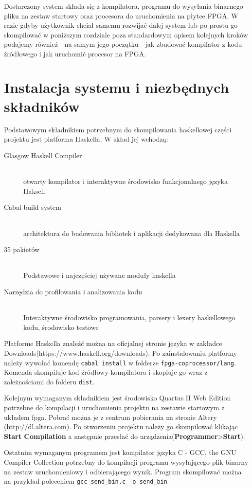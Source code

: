 Dostarczony system składa się z kompilatora, programu do wysyłania binarnego pliku na zestaw startowy oraz procesora do uruchomienia na płytce FPGA. W razie gdyby użytkownik chciał samemu rozwijać dalej system lub po prostu go skompilować w poniższym rozdziale poza standardowym opisem kolejnych kroków podajemy również - na samym jego początku - jak zbudować kompilator z kodu źródłowego i jak uruchomić procesor na FPGA.
\section{Instalacja systemu i niezbędnych składników}
Podstawowym składnikiem potrzebnym do skompilowania haskellowej części projektu jest platforma Haskella. W skład jej wchodzą:
\begin{description}
  \item[Glasgow Haskell Compiler] \hfill \\
  otwarty kompilator i interaktywne środowisko funkcjonalnego języka Haksell 
  \item[Cabal build system] \hfill \\
  architektura do budowania bibliotek i aplikacji dedykowana dla Haskella
  \item[35 pakietów] \hfill \\
  Podstawowe i najczęściej używane moduły haskella
  \item[Narzędzia do profilowania i analizowania kodu] \hfill \\
  Interaktywne środowisko programowania, parsery i lexery haskellowego kodu, środowisko testowe
\end{description}

Platforme Haskella znaleźć można na oficjalnej stronie języka w zakładce Downloads(https://www.haskell.org/downloads).
Po zainstalowaniu platformy należy wywołać komendę \texttt{cabal install} w folderze \texttt{fpga-coprocessor/lang}. Komenda skompiluje kod źródłowy kompilatora i skopiuje go wraz z zależnościami do folderu \texttt{dist}.

Kolejnym wymaganym składnikiem jest środowisko Quartus II Web Edition potrzebne do kompilacji i uruchomienia projektu na zestawie startowym z układem fpga. Pobrać można je z centrum pobierania na stronie Altery (http://dl.altera.com).
Po otworzeniu projektu należy go skompilować klikając \textbf{Start Compilation} a następnie przesłać do urządzenia(\textbf{Programmer}\textgreater \textbf{Start}).

Ostatnim wymaganym programem jest kompilator języka C - GCC, the GNU Compiler Collection potrzebny do kompilacji programu wysyłającego plik binarny na zestaw uruchomieniowy i odbierającego wynik. Program skompilować można na przykład poleceniem 
\texttt{gcc send\_bin.c -o send\_bin}
